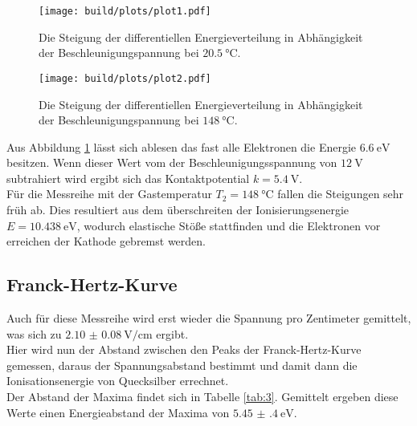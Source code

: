 \begin{figure}[H]
    \centering
    \texttt{[image: build/plots/plot1.pdf]}
    \caption{Die Steigung der differentiellen Energieverteilung in Abhängigkeit der Beschleunigungspannung bei $\SI{20.5}{\celsius}$.}
    \label{img:1}
\end{figure}

\begin{figure}[H]
    \centering
    \texttt{[image: build/plots/plot2.pdf]}
    \caption{Die Steigung der differentiellen Energieverteilung in Abhängigkeit der Beschleunigungspannung bei $\SI{148}{\celsius}$.}
    \label{img:2}
\end{figure}

\noindent
Aus Abbildung \ref{img:1} lässt sich ablesen das fast alle Elektronen die Energie $\SI{6.6}{\eV}$ besitzen. 
Wenn dieser Wert vom der Beschleunigungsspannung von $\SI{12}{\volt}$ subtrahiert wird ergibt sich das Kontaktpotential $k=\SI{5.4}{\volt}$.\\
Für die Messreihe mit der Gastemperatur $T_2=\SI{148}{\celsius}$ fallen die Steigungen sehr früh ab. 
Dies resultiert aus dem überschreiten der Ionisierungsenergie $E=\SI{10,438}{\eV}$\cite{theo}, wodurch elastische Stöße stattfinden und die Elektronen vor erreichen der Kathode gebremst werden.\\



\subsection{Franck-Hertz-Kurve}

\noindent Auch für diese Messreihe wird erst wieder die Spannung pro Zentimeter gemittelt, was sich zu $\SI{2.10(8)}{\volt\per\centi\metre}$ ergibt.\\
Hier wird nun der Abstand zwischen den Peaks der Franck-Hertz-Kurve gemessen, daraus der Spannungsabstand bestimmt und damit dann die Ionisationsenergie von Quecksilber errechnet.\\
Der Abstand der Maxima findet sich in Tabelle \ref{tab:3}. Gemittelt ergeben diese Werte einen Energieabstand der Maxima von $\SI{5.45(40)}{\eV}$.

